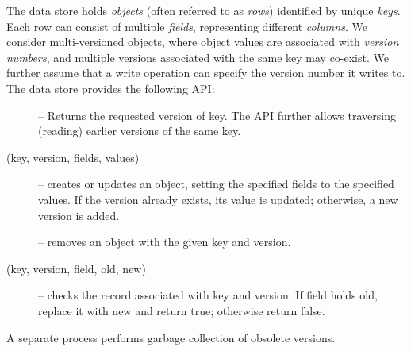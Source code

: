 The  data store holds  \emph{objects} (often referred to as \emph{rows}) identified by unique \emph{keys}.
Each row can consist of multiple \emph{fields}, representing different \emph{columns}. 
We consider multi-versioned objects, where object values are associated with \emph{version numbers}, and
multiple versions associated with the same key may co-exist.
We further assume that a write operation can specify the version number it writes to.
The  data store provides the following API:
\begin{description}
\item [] --  Returns the requested version of key.
The API further allows traversing (reading) earlier versions of the same key.
\item [(key, version, fields, values)] -- 
creates or updates an object, setting the specified fields to the specified values. 
If the version already exists, its value is updated; otherwise, a new version is added. 
\item [] -- removes an object with the given key and version.
\item [(key, version, field, old, new)] -- checks the record associated with key and version. 
If field holds old, replace it with new   and return true; otherwise return false.
\end{description}

A separate process performs garbage collection of obsolete versions.

